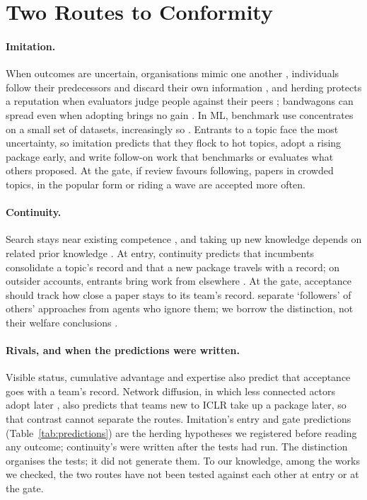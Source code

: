 \documentclass[11pt]{article}
\begin{document}
\section{Two Routes to Conformity}
\label{sec:theory}

\paragraph{Imitation.}
When outcomes are uncertain, organisations mimic one another \citep{dimaggio1983iron}, individuals follow their predecessors
and discard their own information \citep{bikhchandani1992theory,banerjee1992simple}, and herding protects a
reputation when evaluators judge people against their peers \citep{scharfstein1990herd}; bandwagons can spread even
when adopting brings no gain \citep{abrahamson1993institutional}. In ML, benchmark use concentrates on a small set of datasets, increasingly so
\citep{koch2021reduced}. Entrants to a topic face the most uncertainty, so imitation predicts that they flock to hot
topics, adopt a rising package early, and write follow-on work that benchmarks or evaluates what others proposed. At
the gate, if review favours following, papers in crowded topics, in the popular form or riding a wave are accepted
more often.

\paragraph{Continuity.}
Search stays near existing competence \citep{march1991exploration,stuart1996local}, and taking up new knowledge
depends on related prior knowledge \citep{cohen1990absorptive}. At entry, continuity predicts that incumbents
consolidate a topic's record and that a new package travels with a record; on outsider accounts, entrants bring work
from elsewhere \citep{zeng2021fresh,packalen2019age}. At the gate, acceptance should track how close a paper stays to
its team's record. \citet{weisberg2009epistemic} separate `followers' of others' approaches from agents who ignore
them; we borrow the distinction, not their welfare conclusions \citep{alexander2015epistemic}.

\paragraph{Rivals, and when the predictions were written.}
Visible status, cumulative advantage and expertise \citep{merton1968matthew,ibrahim2026bias,li2017expertise} also
predict that acceptance goes with a team's record. Network diffusion, in which less connected actors adopt later
\citep{coleman1957diffusion}, also predicts that teams new to ICLR take up a package later, so that contrast cannot
separate the routes. Imitation's entry and gate predictions (Table~\ref{tab:predictions}) are the herding hypotheses we registered before reading any outcome; continuity's were written after the tests had run.
The distinction organises the tests; it did not generate them. To our knowledge, among the works we checked, the two
routes have not been tested against each other at entry or at the gate.
\end{document}
